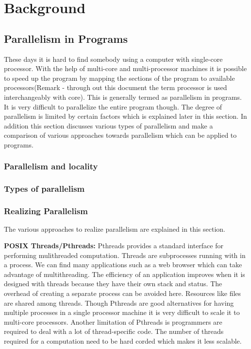 \documentclass[a4paper,12pt]{book}
\begin{document}
\chapter{Background}

\section{Parallelism in Programs}
These days it is hard to find somebody using a computer with single-core processor.
With the help of multi-core and multi-processor machines it is possible to speed up 
the program by mapping the sections of the program to available processors(Remark - 
through out this document the term processor is used interchangeably with core). This 
is generally termed as parallelism in programs. It is very difficult to parallelize
the entire program though. The degree of parallelism is limited by certain factors which is
explained later in this section. In addition this section discusses various types of parallelism and
make a comparison of various approaches towards parallelism which can be applied to programs.

\subsection{Parallelism and locality}

\subsection{Types of parallelism}

\subsection{Realizing Parallelism}

The various approaches to realize parallelism are explained in this section.

\textbf{POSIX Threads/Pthreads:} Pthreads provides a standard interface for performing mulithreaded computation. 
Threads are subprocesses running with in a process. 
We can find many applications such as a web browser which can take advantage of multithreading.
The efficiency of an application improves when it is designed with threads because they have their
own stack and status. The overhead of creating a separate process can be avoided here.
Resources like files are shared among threads. Though Pthreads are good alternatives for
having multiple processes in a single processor machine it is very difficult to scale
it to multi-core processors. Another limitation of Pthreads is programmers are required to
deal with a lot of thread-specific code. The number of threads required for a computation
need to be hard corded which makes it less scalable.
\end{document}
